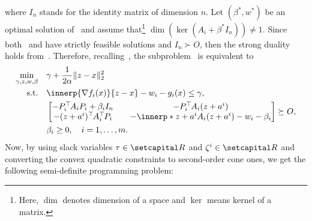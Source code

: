 \documentclass[../../main]{subfiles}
\begin{document}
where $I_n$ stands for the identity matrix of dimension $n$. Let $(\beta^\ast, w^\ast)$ be an optimal solution of~ and assume that\footnote{Here, $\dim$ denotes dimension of a space and $\ker$ means kernel of a matrix.} $\dim(\ker(A_i + \beta^\ast I_n)) \neq 1$. Since both~ and  have strictly feasible solutions and $I_n \succ O$, then the strong duality holds from~\cite[Theorem~3.5]{Beck2006}. Therefore, recalling~, the subproblem~ is equivalent to
\begin{equation}
    \begin{aligned}
        \min_{\gamma, z, w, \beta} \quad & \gamma + \frac{1}{2 \alpha} \norm{z - x}_2^2 \\ 
        \st    \quad   & \innerp{\nabla f_i(x)}{z - x} - w_i - g_i (x) \leq \gamma, \\
                       & \begin{bmatrix}
                           -P_i^\T A_i P_i + \beta_i I_n &\quad -P_i^\T A_i (z + a^i) \\
                           -(z + a^i)^\T A_i^\T P_i &\quad -\innerp*{z + a^i}{A_i (z + a^i)} - w_i -\beta_i
                       \end{bmatrix} 
                       \succeq O, \\
                       & \beta_i \geq 0, \quad i = 1,\dots,m.
    \end{aligned}
\end{equation}
Now, by using slack variables $\tau \in \setR$ and $\zeta^i \in \setR$ and converting the convex quadratic constraints to second-order cone ones, we get the following semi-definite programming problem:
\end{document}
